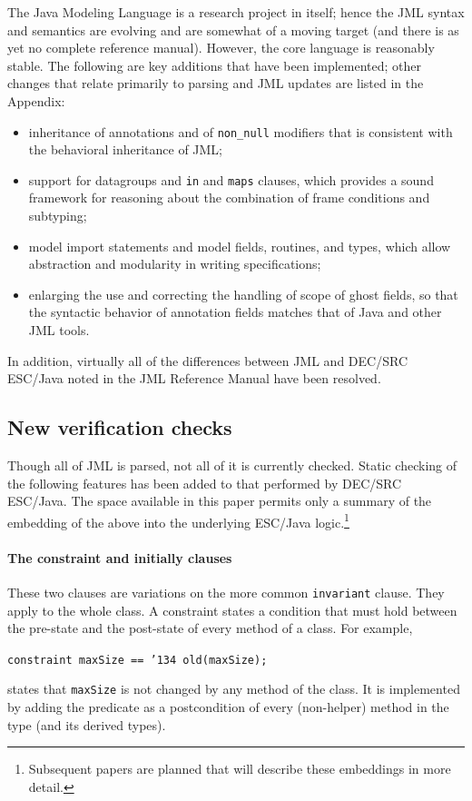 \documentclass{llncs}
\begin{document}
The Java Modeling Language is a research project in itself; hence the
JML syntax and semantics are evolving and are somewhat of a moving
target (and there is as yet no complete reference manual).  However,
the core language is reasonably stable.  The following are key
additions that have been implemented; other changes that relate
primarily to parsing and JML updates are listed in the Appendix:

\setlength{\partopsep}{0in}\setlength{\parskip}{0in}\setlength{\itemsep}{0in}\setlength{\topsep}{0in}
\begin{itemize}
\setlength{\partopsep}{0in}\setlength{\parskip}{0in}\setlength{\itemsep}{0in}\setlength{\topsep}{0in}
\item inheritance of annotations and of \texttt{non\_null} modifiers
  that is consistent with the behavioral inheritance of JML;
\item support for datagroups and \texttt{in} and \texttt{maps}
  clauses, which provides a sound framework for reasoning about the
  combination of frame conditions and subtyping;
\item model import statements and model fields, routines, and types,
  which allow abstraction and modularity in writing specifications;
\item enlarging the use and correcting the handling of scope of ghost
  fields, so that the syntactic behavior of annotation fields matches
  that of Java and other JML tools.
\end{itemize}
In addition, virtually all of the differences between JML and DEC/SRC
ESC/Java noted in the JML Reference Manual have been resolved.

\subsection{New verification checks}
Though all of JML is parsed, not all of it is currently checked.
Static checking of the following features has been added to that
performed by DEC/SRC ESC/Java.  The space available in this paper
permits only a summary of the embedding of the above into the
underlying ESC/Java logic.\footnote{Subsequent papers are planned that
  will describe these embeddings in more detail.}

\paragraph*{The constraint and initially clauses}
These two clauses are variations on the more common \texttt{invariant}
clause.  They apply to the whole class.  A constraint states a
condition that must hold between the pre-state and the post-state of
every method of a class.  For example,
\begin{center}
\texttt{constraint maxSize == \char'134 old(maxSize); }
\end{center}
states that \texttt{maxSize} is not changed by any method of the
class.  It is implemented by adding the predicate as a postcondition
of every (non-helper) method in the type (and its derived types).
\end{document}

